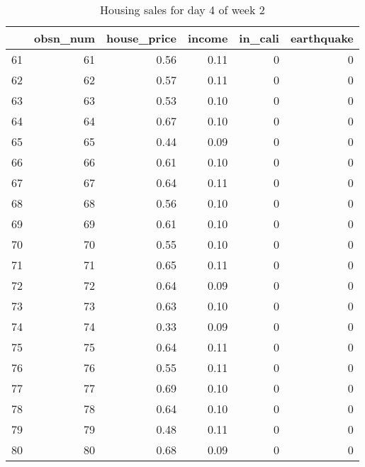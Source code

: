 \begin{table}[ht]
\centering
\begin{tabular}{rrrrrr}
  \hline
 & obsn\_num & house\_price & income & in\_cali & earthquake \\ 
  \hline
61 &  61 & 0.56 & 0.11 &   0 &   0 \\ 
  62 &  62 & 0.57 & 0.11 &   0 &   0 \\ 
  63 &  63 & 0.53 & 0.10 &   0 &   0 \\ 
  64 &  64 & 0.67 & 0.10 &   0 &   0 \\ 
  65 &  65 & 0.44 & 0.09 &   0 &   0 \\ 
  66 &  66 & 0.61 & 0.10 &   0 &   0 \\ 
  67 &  67 & 0.64 & 0.11 &   0 &   0 \\ 
  68 &  68 & 0.56 & 0.10 &   0 &   0 \\ 
  69 &  69 & 0.61 & 0.10 &   0 &   0 \\ 
  70 &  70 & 0.55 & 0.10 &   0 &   0 \\ 
  71 &  71 & 0.65 & 0.11 &   0 &   0 \\ 
  72 &  72 & 0.64 & 0.09 &   0 &   0 \\ 
  73 &  73 & 0.63 & 0.10 &   0 &   0 \\ 
  74 &  74 & 0.33 & 0.09 &   0 &   0 \\ 
  75 &  75 & 0.64 & 0.11 &   0 &   0 \\ 
  76 &  76 & 0.55 & 0.11 &   0 &   0 \\ 
  77 &  77 & 0.69 & 0.10 &   0 &   0 \\ 
  78 &  78 & 0.64 & 0.10 &   0 &   0 \\ 
  79 &  79 & 0.48 & 0.11 &   0 &   0 \\ 
  80 &  80 & 0.68 & 0.09 &   0 &   0 \\ 
   \hline
\end{tabular}
\caption{Housing sales for day 4 of week 2} 
\end{table}
